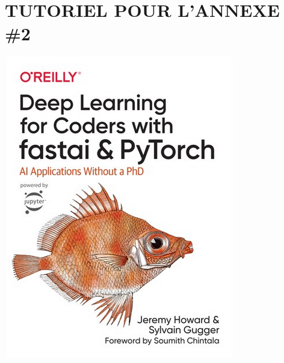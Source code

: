 \documentclass[12pt]{article} 	%
\makeatletter
\newif\ifnotes
\newcommand{\note}[1]{\@bsphack\ifnotes{#1}\fi\@esphack}
\makeatother
\begin{document}
\section{TUTORIEL POUR L'ANNEXE \#2}\label{appendix:fastbook}
\begin{center}
    \includegraphics[scale=1.3]{img/fastbook.png}
\end{center}

\newpage

\note{
\newpage


}
\end{document}
